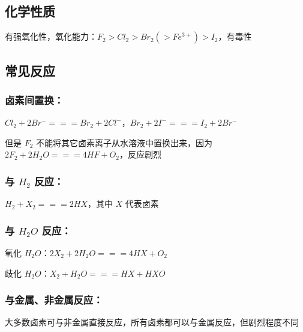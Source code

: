 \documentclass[UTF8,zihao=-4,openany]{ctexbook}
\begin{document}
\subsection{化学性质}
有强氧化性，氧化能力：$F_2>Cl_2>Br_2(>Fe^{3+})>I_2$，有毒性\par
\subsection{常见反应}
\subsubsection{卤素间置换：}
$Cl_2+2Br^-=\!=\!=Br_2+2Cl^-$，$Br_2+2I^-=\!=\!=I_2+2Br^-$\par

但是 $F_2$ 不能将其它卤素离子从水溶液中置换出来，因为 $2F_2+2H_2O=\!=\!=4HF+O_2$，反应剧烈\par
\subsubsection{与 $H_2$ 反应：}
$H_2+X_2=\!=\!=2HX$，其中 $X$ 代表卤素\par
\begin{table}[H]
\centering
\scriptsize
\renewcommand{\arraystretch}{1.12}
\end{table}
\subsubsection{与 $H_2O$ 反应：}
氧化 $H_2O$：$2X_2+2H_2O=\!=\!=4HX+O_2$\par

歧化 $H_2O$：$X_2+H_2O=\!=\!=HX+HXO$\par
\subsubsection{与金属、非金属反应：}
大多数卤素可与非金属直接反应，所有卤素都可以与金属反应，但剧烈程度不同\par
\end{document}
